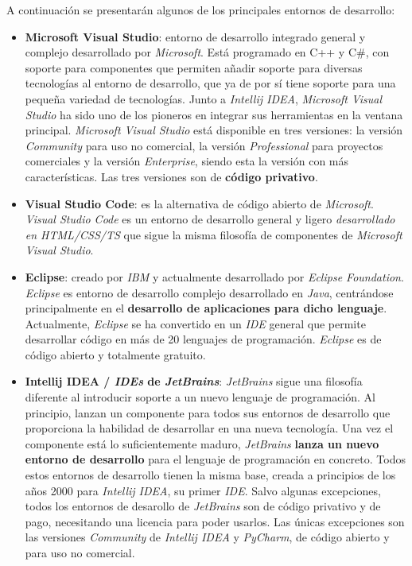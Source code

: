 A continuación se presentarán algunos de los principales
entornos de desarrollo:
\begin{itemize}
    \item \textbf{Microsoft Visual Studio}\cite{VISUALSTUDIO}: entorno de desarrollo
    integrado general y complejo desarrollado por \textit{Microsoft}.
    Está programado en C++ y C\#, con soporte para componentes
    que permiten añadir soporte para diversas tecnologías
    al entorno de desarrollo, que ya de por sí tiene soporte para una pequeña
    variedad de tecnologías.
    Junto a \textit{Intellij IDEA}, \textit{Microsoft Visual Studio} ha sido uno
    de los pioneros en integrar sus herramientas en la ventana principal.
    \textit{Microsoft Visual Studio} está disponible en tres versiones: la versión
    \textit{Community} para uso no comercial, la versión \textit{Professional} para
    proyectos comerciales y la versión \textit{Enterprise}, siendo esta la versión
    con más características.
    Las tres versiones son de \textbf{código privativo}.
    \item \textbf{Visual Studio Code}\cite{VISUALSTUDIOCODE}:
    es la alternativa de código abierto de \textit{Microsoft}.
    \textit{Visual Studio Code} es un entorno de desarrollo general
    y ligero \textit{desarrollado en HTML/CSS/TS} que sigue la misma filosofía
    de componentes de \textit{Microsoft Visual Studio}.
    \item \textbf{Eclipse}\cite{ECLIPSE}: creado por \textit{IBM} y actualmente
    desarrollado por \textit{Eclipse Foundation}.
    \textit{Eclipse} es entorno de desarrollo complejo desarrollado en \textit{Java},
    centrándose principalmente en el \textbf{desarrollo de aplicaciones para dicho lenguaje}.
    Actualmente, \textit{Eclipse} se ha convertido en un \textit{IDE} general que
    permite desarrollar código en más de 20 lenguajes de programación.
    \textit{Eclipse} es de código abierto y totalmente gratuito.
    \item \textbf{Intellij IDEA / \textit{IDEs} de \textit{JetBrains}}\cite{INTELLIJIDEA}:
    \textit{JetBrains} sigue una filosofía diferente al introducir
    soporte a un nuevo lenguaje de programación.
    Al principio, lanzan un componente para todos sus entornos de desarrollo
    que proporciona la habilidad de desarrollar en una nueva tecnología.
    Una vez el componente está lo suficientemente maduro, \textit{JetBrains}
    \textbf{lanza un nuevo entorno de desarrollo} para el lenguaje de programación
    en concreto.
    Todos estos entornos de desarrollo tienen la misma base, creada a
    principios de los años 2000 para \textit{Intellij IDEA}, su primer \textit{IDE}.
    Salvo algunas excepciones, todos los entornos de desarollo de \textit{JetBrains}
    son de código privativo y de pago, necesitando una licencia para poder usarlos.
    Las únicas excepciones son las versiones \textit{Community} de \textit{Intellij IDEA}
    y \textit{PyCharm}, de código abierto y para uso no comercial.
\end{itemize}
